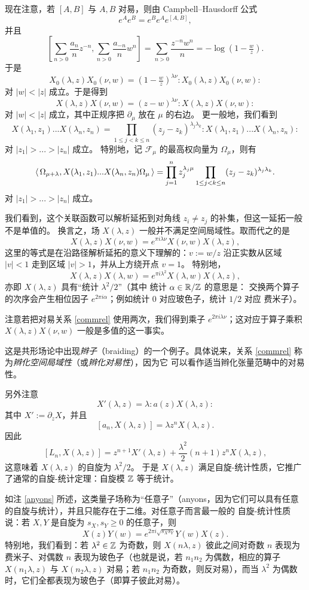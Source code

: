 现在注意，若 $[A,B]$ 与 $A,B$ 对易，则由 Campbell--Hausdorff 公式
$$
e^A e^B=e^B e^A e^{[A,B]}, 
$$
并且
$$
[\sum_{n>0}\frac{a_{n}}{n}z^{-n},\sum_{n>0}\frac{a_{-n}}{n}w^{n}]=\sum_{n>0}\frac{z^{-n}w^{n}}{n}=-\log(1-\tfrac{w}{z}).
$$
于是
$$
X_0(\lambda,z)X_0(\nu,w)=(1-\tfrac{w}{z})^{\lambda \nu}:X_0(\lambda,z)X_0(\nu,w):
$$
对 $|w|<|z|$ 成立。于是得到
$$
X(\lambda,z)X(\nu,w)=(z-w)^{\lambda \nu}:X(\lambda,z)X(\nu,w):
$$
对 $|w|<|z|$ 成立，其中正规序把 $\partial_\mu$ 放在 $\mu$ 的右边。
更一般地，我们看到
$$
X(\lambda_1,z_1)...X(\lambda_n,z_n)=\prod_{1\le j<k\le n}(z_j-z_k)^{\lambda_j \lambda_k} :X(\lambda_1,z_1)...X(\lambda_n,z_n):
$$
对 $|z_1|>...>|z_n|$ 成立。
特别地，记 $\mathcal F_\mu$ 的最高权向量为 $\Omega_\mu$，则有
$$
\la \Omega_{\mu+\lambda}, X(\lambda_1,z_1)...X(\lambda_n,z_n)\Omega_\mu \ra=
\prod_{j=1}^n z_j^{\lambda_j\mu}\prod_{1\le j<k\le n}(z_j-z_k)^{\lambda_j \lambda_k}.
$$
对 $|z_1|>...>|z_n|$ 成立。

我们看到，这个关联函数可以解析延拓到对角线 $z_i\ne z_j$ 的补集，但这一延拓一般不是单值的。
换言之，场 $X(\lambda,z)$ 一般并不满足空间局域性。取而代之的是
\begin{equation}\label{commrel}
X(\lambda,z)X(\nu,w)=e^{\pi i\lambda\nu}X(\nu,w)X(\lambda,z),
\end{equation} 
这里的等式是在沿路径解析延拓的意义下理解的：$v:=w/z$ 沿正实数从区域 $|v|<1$ 走到区域 $|v|>1$，并从上方绕开点 $v=1$。
特别地，
$$
X(\lambda,z)X(\lambda,w)=e^{\pi i\lambda^2}X(\lambda,w)X(\lambda,z),
$$
亦即 $X(\lambda,z)$ 具有“统计 $\lambda^2/2$”（其中
统计 $\alpha\in \Bbb R/ \Bbb Z$ 的意思是：
交换两个算子的次序会产生相位因子
$e^{2\pi i\alpha}$；例如统计
$0$ 对应玻色子，统计 $1/2$ 对应
费米子）。

注意若把对易关系 \eqref{commrel} 使用两次，我们得到乘子
$e^{2\pi i\lambda\nu}$；这对应于算子乘积 $X(\lambda,z)X(\nu,w)$ 一般是多值的这一事实。

这是共形场论中出现\emph{辫子}（braiding）的一个例子。具体说来，关系 \eqref{commrel}
称为\emph{辫化空间局域性}（或\emph{辫化对易性}），因为它
可以看作适当辫化张量范畴中的对易性。

另外注意
$$
X'(\lambda,z)=\lambda :a(z)X(\lambda,z):
$$
其中 $X':=\partial_z X$，并且
$$
[a_n,X(\lambda,z)]=\lambda z^nX(\lambda,z).
$$
因此
$$
[L_n,X(\lambda,z)]=z^{n+1}X'(\lambda,z)+\frac{\lambda^2}{2}
(n+1)z^nX(\lambda,z),
$$
这意味着 $X(\lambda,z)$ 的自旋为 $\lambda^2/2$。
于是 $X(\lambda,z)$ 满足自旋-统计性质，它推广了通常的自旋-统计定理：自旋模 $\Bbb Z$ 等于统计。

如注 \ref{anyons} 所述，这类量子场称为“任意子”（anyons，因为它们可以具有任意的自旋与统计），并且只能存在于二维。对任意子而言最一般的
自旋-统计性质说：若 $X,Y$ 是自旋为 $s_X,s_Y\ge 0$ 的任意子，则
$$
X(z)Y(w)=e^{2\pi i \sqrt{s_Xs_Y}}Y(w)X(z).
$$
特别地，我们看到：若 $\lambda^2\in \Bbb Z$ 为奇数，则 $X(n\lambda,z)$
彼此之间对奇数 $n$ 表现为费米子、对偶数 $n$ 表现为玻色子（也就是说，若 $n_1n_2$ 为偶数，相应的算子 $X(n_1\lambda,z)$ 与
$X(n_2\lambda,z)$ 对易；若 $n_1n_2$ 为奇数，则反对易），而当 $\lambda^2$ 为偶数时，它们全都表现为玻色子（即算子彼此对易）。

